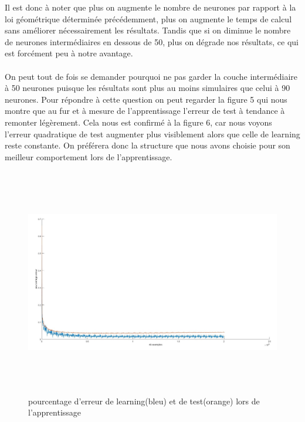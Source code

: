 \documentclass[a4paper,twoside]{report}
\begin{document}
Il est donc à noter que plus on augmente le nombre de neurones par rapport à la loi géométrique déterminée précédemment, plus on augmente le temps de calcul sans améliorer nécessairement les résultats. Tandis que si on diminue le nombre de neurones intermédiaires en dessous de 50, plus on dégrade nos résultats, ce qui est forcément peu à notre avantage.

\newpage
\paragraph{}
On peut tout de fois se demander pourquoi ne pas garder la couche intermédiaire à 50 neurones puisque les résultats sont plus au moins simulaires que celui à 90 neurones. Pour répondre à cette question on peut regarder la figure 5 qui nous montre que au fur et à mesure de l'apprentissage l'erreur de test à tendance à remonter légèrement. Cela nous est confirmé à la figure 6, car nous voyons l'erreur quadratique de test augmenter plus visiblement alors que celle de learning reste constante. On préférera donc la structure que nous avons choisie pour son meilleur comportement lors de l'apprentissage.
\begin{figure}[!h]
	\begin{center}
		\includegraphics[width=17cm,height=10cm]{Images/courbes3couches50.jpg} 
		\caption{pourcentage d'erreur de learning(bleu) et de test(orange) lors de l'apprentissage} 
	\end{center}
\end{figure}
\end{document}

